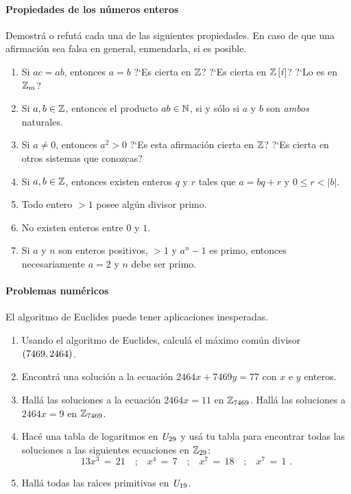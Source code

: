 \paragraph{Propiedades de los n\'umeros enteros}
Demostr\'a o refut\'a cada una de las siguientes propiedades.
En caso de que una afirmaci\'on sea falsa en
general, enmendarla, si es posible.
\begin{enumerate}[label=P\arabic*]
	\conti
	\item\label{item:cancelatividad}
		Si $ac=ab$, entonces $a=b$ ?`Es cierta en $\Enteros$?
		?`Es cierta en $\polinomios[\raizcuarta] \Enteros$?
		?`Lo es en $\Enterosmod[m]$?
	\item\label{item:naturales:clausura}
		Si $a,b\in\Enteros$, entonces el producto $ab\in\Naturales$,
		si y s\'olo si $a$ y $b$ son \emph{ambos} naturales.
	\item\label{item:cuadrados}
		Si $a\neq 0$, entonces $a^2>0$ ?`Es esta afirmaci\'on
		cierta en $\Enteros$? ?`Es cierta en otros sistemas
		que conozcas?
	\item\label{item:division}
		Si $a,b\in\Enteros$, entonces existen enteros
		$q$ y $r$ tales que $a=bq+r$ y $0\leq r<|b|$.
	\item\label{item:reducibilidad}
		Todo entero $>1$ posee alg\'un divisor primo.
	\item\label{item:discreto}
		No existen enteros entre $0$ y $1$.
	\item\label{item:mersenne}
		Si $a$ y $n$ son enteros positivos, $>1$ y
		$a^n-1$ es primo, entonces necesariamente
		$a=2$ y $n$ debe ser primo.
	\seti
\end{enumerate}
%

\paragraph{Problemas num\'ericos}
El algoritmo de Euclides puede tener aplicaciones inesperadas.
\begin{enumerate}[label=P\arabic*]
	\conti
	\item\label{item:mcd}
		Usando el algoritmo de Euclides, calcul\'a
		el m\'aximo com\'un divisor
		$\mcd{7469,2464}$.
	\item\label{item:diofantica}
		Encontr\'a una soluci\'on a la ecuaci\'on
		$2464x+7469y=77$ con $x$ e $y$ enteros.
	\item\label{item:inversos}
		Hall\'a las soluciones a la ecuaci\'on
		$2464x=11$ en $\Enterosmod[7469]$.
		Hall\'a las soluciones a $2464x=9$ en $\Enterosmod[7469]$.
	\item\label{item:logaritmos}
		Hac\'e una tabla de logaritmos en $\Unidadesmod[29]$
		y us\'a tu tabla para encontrar todas las soluciones
		a las siguientes ecuaciones en $\Enterosmod[29]$:
		\begin{displaymath}
			13x^3\,=\,21\quad\text{;}\quad
			x^4\,=\,7\quad\text{;}\quad
			x^7\,=\,18\quad\text{;}\quad
			x^7\,=\,1\text{ .}
		\end{displaymath}
	\item\label{item:primitivas}
		Hall\'a todas las ra\'{\i}ces primitivas en
		$\Unidadesmod[19]$.
	\seti
\end{enumerate}
%

